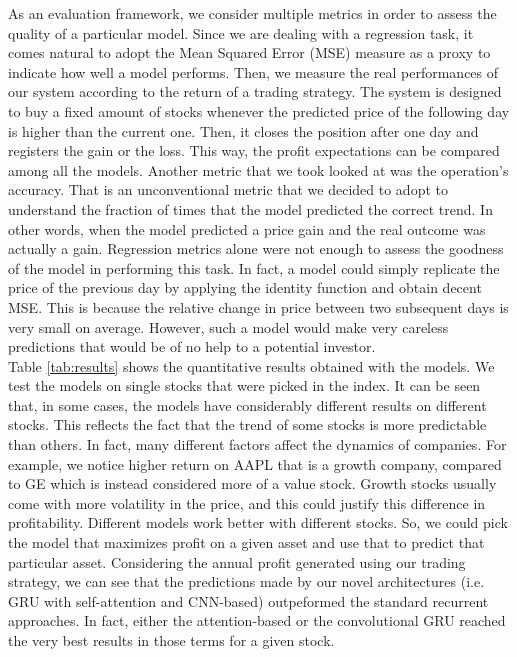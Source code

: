 \documentclass{article}
\begin{document}
As an evaluation framework, we consider multiple metrics in order to assess the quality
of a particular model. Since we are dealing with a regression task, it comes natural
to adopt the Mean Squared Error (MSE) measure as a proxy to indicate how well a model
performs. Then, we measure the real performances
of our system according to the return of a trading strategy. The system is
designed to buy a fixed amount of stocks whenever the predicted price of
the following day is higher than the current one. Then, it closes the position after one
day and registers the gain or the loss. This way, the profit expectations can be compared
among all the models. Another metric that we took looked at was the operation's
accuracy. That is an unconventional metric that we decided to adopt to understand the
fraction of times that the model predicted the correct trend. In other words, when the model
predicted a price gain and the real outcome was actually a gain.
Regression metrics alone were not enough
to assess the goodness of the model in performing this task. In fact, a model could
simply replicate the price of the previous day by applying the identity function and obtain
decent MSE. This is because the relative change in price between two subsequent days is
very small on average. However, such a model would make very careless predictions that
would be of no help to a potential investor. \\
Table \ref{tab:results} shows the quantitative results obtained with the models.
We test the models on single stocks that were picked in the index. It can be seen that, in some cases,
the models have considerably different results on different stocks. This reflects the fact that the trend
of some stocks is more predictable than others. In fact, many different factors affect the dynamics of companies.
For example, we notice higher return on AAPL that is a growth company, compared to GE which is instead
considered more of a value stock. Growth stocks usually come with more volatility in the price, and this could
justify this difference in profitability. Different models work better with different stocks. So,
we could pick the model that maximizes profit on a given asset and use that to predict
that particular asset.
Considering the annual profit generated using our trading strategy,
we can see that the predictions made by our novel architectures (i.e. GRU with self-attention
and CNN-based) outpeformed the standard recurrent approaches. In fact, either the attention-based
or the convolutional GRU reached the very best results in those terms for a given stock.
\end{document}
